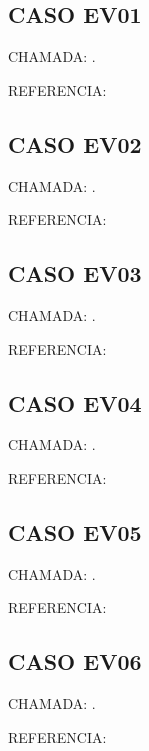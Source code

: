 \documentclass{undftex}
\begin{document}
\begin{refsection}\section*{CASO EV01} CHAMADA: . \textcite{v21}\par REFERENCIA:\par\printbibliography[heading=none,check=undfconsultadas]\end{refsection}\clearpage
\begin{refsection}\section*{CASO EV02} CHAMADA: . \textcite{ev02}\par REFERENCIA:\par\printbibliography[heading=none,check=undfconsultadas]\end{refsection}\clearpage
\begin{refsection}\section*{CASO EV03} CHAMADA: . \textcite{ev03}\par REFERENCIA:\par\printbibliography[heading=none,check=undfconsultadas]\end{refsection}\clearpage
\begin{refsection}\section*{CASO EV04} CHAMADA: . \textcite{ev04}\par REFERENCIA:\par\printbibliography[heading=none,check=undfconsultadas]\end{refsection}\clearpage
\begin{refsection}\section*{CASO EV05} CHAMADA: . \textcite{ev05}\par REFERENCIA:\par\printbibliography[heading=none,check=undfconsultadas]\end{refsection}\clearpage
\begin{refsection}\section*{CASO EV06} CHAMADA: . \textcite{ev06}\par REFERENCIA:\par\printbibliography[heading=none,check=undfconsultadas]\end{refsection}\clearpage
\end{document}
